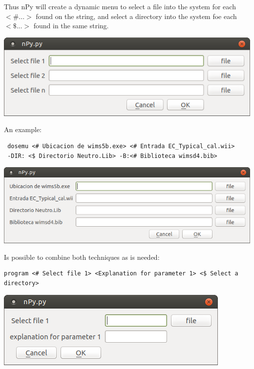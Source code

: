 \documentclass[a4paper,10pt]{article}
\begin{document}
Thus nPy will create a dynamic menu to select a file into the system for each $<\# ...>$ found on the 
string, and select a directory into the system foe each $<\$ ...>$ found in the same string.

\begin{center}
 \includegraphics[width=\textwidth]{img/contextMenuExampleFile.png}
\end{center}

\noindent An example:

\begin{verbatim}
 dosemu <# Ubicacion de wims5b.exe> <# Entrada EC_Typical_cal.wii> 
 -DIR: <$ Directorio Neutro.Lib> -B:<# Biblioteca wimsd4.bib>
 \end{verbatim}

\begin{center}
 \includegraphics[width=\textwidth]{img/contextMenuFile.png}
\end{center}

\noindent Is possible to combine both techniques as is needed:

\begin{verbatim}
program <# Select file 1> <Explanation for parameter 1> <$ Select a directory>
 \end{verbatim}

 \begin{center}
 \includegraphics[width=\textwidth]{img/contextMenuExampleCombined.png}
\end{center}
\end{document}
